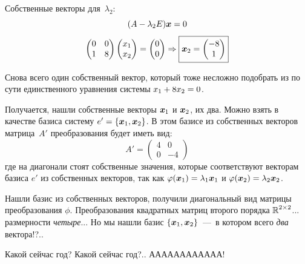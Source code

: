 \documentclass[a4paper,12pt]{article}
\begin{document}
\begin{solution}
    Собственные векторы для~$\lambda_2$:
    \[
      (A - \lambda_2 E) \boldsymbol x = 0
    \]
    \[
      \begin{pmatrix}
        0 & 0\\
        1 & 8
      \end{pmatrix} \begin{pmatrix}
        x_1\\
        x_2
      \end{pmatrix} = \begin{pmatrix}
        0\\
        0
      \end{pmatrix}
      \Rightarrow \boxed{
        \boldsymbol x_2 = \begin{pmatrix}
          -8\\
          1
        \end{pmatrix}
      }
    \]
    
    Снова всего один собственный вектор, который тоже несложно подобрать из по сути единственного уравнения системы $x_1 \hm+ 8 x_2 \hm= 0$.
    
    Получается, нашли собственные векторы $\boldsymbol x_1$ и $\boldsymbol x_2$, их два.
    Можно взять в качестве базиса систему $e' \hm= \{\bds x_1, \bds x_2\}$.
    В этом базисе из собственных векторов матрица~$A'$ преобразования будет иметь вид:
    \[
      A' = \begin{pmatrix}
        4 & 0\\
        0 & -4
      \end{pmatrix}
    \]
    где на диагонали стоят собственные значения, которые соответствуют векторам базиса $e'$ из собственных векторов, так как $\phi(\bds x_1) \hm= \lambda_1 \bds x_1$ и $\phi(\bds x_2) \hm= \lambda_2 \bds x_2$.
    
    Нашли базис из собственных векторов, получили диагональный вид матрицы преобразования $\phi$.
    Преобразования квадратных матриц второго порядка $\operatorname{\mathbb R}^{2\times 2}$...
    размерности \emph{четыре}...
    Но мы нашли базис $\{\boldsymbol x_1, \boldsymbol x_2\}$~---~в котором всего \emph{два} вектора!?..
    
    \bigskip
    
    Какой сейчас год?
    Какой сейчас год?..
    АААААААААААА!
  \end{solution}
\end{document}
